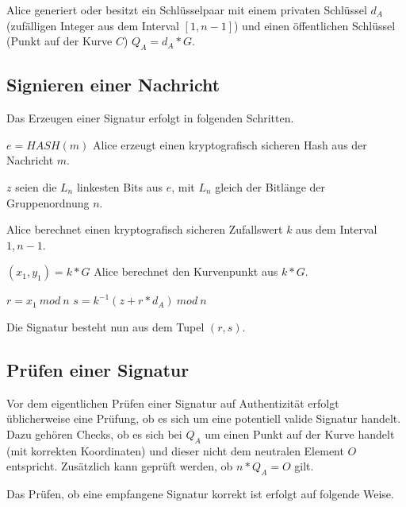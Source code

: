 Alice generiert oder besitzt ein Schlüsselpaar mit einem privaten Schlüssel $d_A$ (zufälligen Integer aus dem Interval $[1, n-1]$) 
und einen öffentlichen Schlüssel (Punkt auf der Kurve $C$) $Q_A = d_A*G$.

\subsection{Signieren einer Nachricht}\label{sign}

Das Erzeugen einer Signatur erfolgt in folgenden Schritten.

\begin{compactenum}[(1)]
	\item $e = HASH(m)$ \newline Alice erzeugt einen kryptografisch sicheren Hash aus der Nachricht $m$.
	\item $z$ seien die $L_n$ linkesten Bits aus $e$, mit $L_n$ gleich der Bitlänge der Gruppenordnung $n$.
	\item Alice berechnet einen kryptografisch sicheren Zufallswert $k$ aus dem Interval $1, n-1$.
	\item $(x_1, y_1) = k * G$ \newline Alice berechnet den Kurvenpunkt aus $k*G$.
	\item $r = x_1\ mod\ n$ \newline $s = k^{-1}(z+r*d_A)\ mod\ n$
\end{compactenum}

Die Signatur besteht nun aus dem Tupel $(r,s)$.

\subsection{Prüfen einer Signatur}\label{validate_Signature}

Vor dem eigentlichen Prüfen einer Signatur auf Authentizität erfolgt üblicherweise eine Prüfung, ob es sich um
eine potentiell valide Signatur handelt. Dazu gehören Checks, ob es sich bei $Q_A$ um einen Punkt auf der Kurve handelt
(mit korrekten Koordinaten) und dieser nicht dem neutralen Element $O$ entspricht. Zusätzlich kann geprüft werden, ob 
$n*Q_A = O$ gilt.

Das Prüfen, ob eine empfangene Signatur korrekt ist erfolgt auf folgende Weise.

